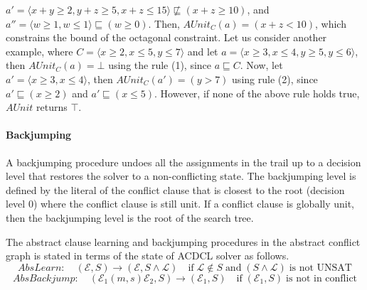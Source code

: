 $a'= \langle x+y \geq 2, y+z \geq 5, x+z \leq 15 \rangle \not\sqsubseteq (x+z \geq 10)$, and 
$a''= \langle w \geq 1, w \leq 1 \rangle \sqsubseteq (w \geq 0)$.  Then, $\mathit{AUnit}_C(a) = (x+z < 10)$, 
which constrains the bound of the octagonal constraint.  
Let us consider another example, where $C = \langle x \geq 2, x \leq 5, y \leq 7 \rangle$
and let $a = \langle x \geq 3, x \leq 4, y \geq 5, y \leq 6 \rangle$, then $\mathit{AUnit}_C(a) = \bot$ using
the rule (1), since $a \sqsubseteq C$.  Now, let $a' = \langle x \geq 3, x \leq 4 \rangle$, 
then $\mathit{AUnit}_C(a') = (y > 7)$ using rule (2), since $a' \sqsubseteq (x \geq 2)$
and $a' \sqsubseteq (x \leq 5)$.  However, if none of the above rule holds true, $\mathit{AUnit}$ 
returns $\top$.   
 
\paragraph {\textbf{Backjumping}}
A backjumping procedure undoes all the assignments in the trail up to 
a decision level that restores the solver to a non-conflicting state.  
The backjumping level is defined by the literal of the conflict clause 
that is closest to the root (decision level 0) where the conflict 
clause is still unit.  If a conflict clause is globally unit, then the 
backjumping level is the root of the search tree.

The abstract clause learning and backjumping procedures in the abstract 
conflict graph is stated in terms of the state of ACDCL solver as follows.
\[AbsLearn: \quad  (\mathcal{E},S) \rightarrow (\mathcal{E},S \wedge
\mathcal{L}) \quad \text{if} \; \mathcal{L} \notin S \; \textrm{and}
\; (S \wedge \mathcal{L}) \; \text{is not UNSAT} \]
\[AbsBackjump: \quad (\mathcal{E}_1(m,s)\mathcal{E}_2,S) \rightarrow
(\mathcal{E}_1,S) \quad \text{if} \; (\mathcal{E}_1,S) \; \text{is not in conflict} \]   

